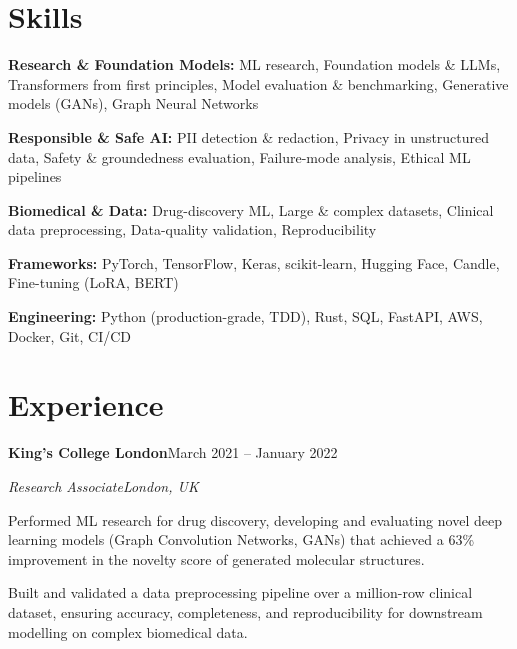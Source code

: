 \documentclass[10pt,a4paper]{article}
\newcommand{\entry}[4]{%
  {\color{company}\bfseries #1}\hfill {\color{muted}#2}\par
  \vspace{1pt}
  {\itshape #3}\hfill {\color{muted}\itshape #4}\par
  \vspace{3pt}%
}
\begin{document}
\section{Skills}
\begin{tight}
  \item[\textcolor{accent}{\small$\bullet$}] \textbf{Research \& Foundation Models:} ML research, Foundation models \& LLMs, Transformers from first principles, Model evaluation \& benchmarking, Generative models (GANs), Graph Neural Networks
  \item[\textcolor{accent}{\small$\bullet$}] \textbf{Responsible \& Safe AI:} PII detection \& redaction, Privacy in unstructured data, Safety \& groundedness evaluation, Failure-mode analysis, Ethical ML pipelines
  \item[\textcolor{accent}{\small$\bullet$}] \textbf{Biomedical \& Data:} Drug-discovery ML, Large \& complex datasets, Clinical data preprocessing, Data-quality validation, Reproducibility
  \item[\textcolor{accent}{\small$\bullet$}] \textbf{Frameworks:} PyTorch, TensorFlow, Keras, scikit-learn, Hugging Face, Candle, Fine-tuning (LoRA, BERT)
  \item[\textcolor{accent}{\small$\bullet$}] \textbf{Engineering:} Python (production-grade, TDD), Rust, SQL, FastAPI, AWS, Docker, Git, CI/CD
\end{tight}

\section{Experience}
\entry{King's College London}{March 2021 -- January 2022}{Research Associate}{London, UK}
\begin{tight}
  \item Performed ML research for drug discovery, developing and evaluating novel deep learning models (Graph Convolution Networks, GANs) that achieved a 63\% improvement in the novelty score of generated molecular structures.
  \item Built and validated a data preprocessing pipeline over a million-row clinical dataset, ensuring accuracy, completeness, and reproducibility for downstream modelling on complex biomedical data.
\end{tight}
\end{document}
